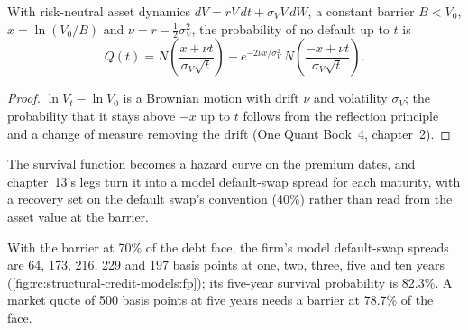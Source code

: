\begin{proposition}\label{prop:rc:structural-credit-models:fp}
With risk-neutral asset dynamics $dV = rV\,dt+\sigma_VV\,dW$, a constant barrier $B<V_0$,
$x = \ln(V_0/B)$ and $\nu = r-\tfrac12\sigma_V^2$, the probability of no default up to $t$ is
\[
Q(t) = N\!\left(\frac{x+\nu t}{\sigma_V\sqrt t}\right)
- e^{-2\nu x/\sigma_V^2}\,N\!\left(\frac{-x+\nu t}{\sigma_V\sqrt t}\right).
\]
\end{proposition}
\begin{proof}
$\ln V_t-\ln V_0$ is a Brownian motion with drift $\nu$ and volatility $\sigma_V$; the
probability that it stays above $-x$ up to $t$ follows from the reflection principle and a
change of measure removing the drift (One Quant Book~4, chapter~2).
\end{proof}

\label{lst:rc:structural-credit-models:fp}

The survival function becomes a hazard curve on the premium dates, and chapter~13's legs
turn it into a model default-swap spread for each maturity, with a recovery set on the
default swap's convention (40\%) rather than read from the asset value at the barrier.

\begin{example}\label{ex:rc:structural-credit-models:fp}
With the barrier at 70\% of the debt face, the firm's model default-swap spreads are 64,
173, 216, 229 and 197 basis points at one, two, three, five and ten years
(\cref{fig:rc:structural-credit-models:fp}); its five-year survival probability is 82.3\%. A
market quote of 500 basis points at five years needs a barrier at 78.7\% of the face.
\end{example}

